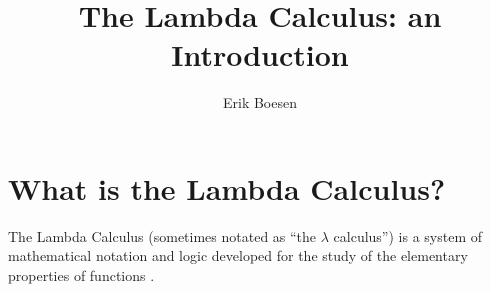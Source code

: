 \documentclass{article}
\begin{document}
\title{The Lambda Calculus: an Introduction}
\author{Erik Boesen}
\maketitle

\begin{abstract}
\end{abstract}

\section{What is the Lambda Calculus?}
The Lambda Calculus (sometimes notated as ``the $\lambda$ calculus'') is a system of mathematical notation and logic developed for the study of the elementary properties of functions \cite{rojastutorial}.


\end{document}
